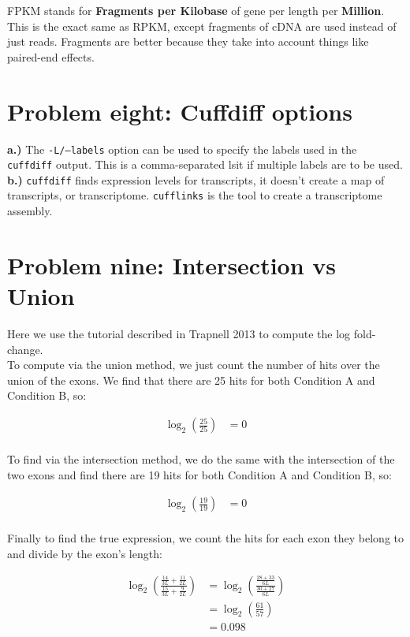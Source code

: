 \documentclass[10pt]{article} %
\begin{document}
FPKM stands for \textbf{Fragments per Kilobase} of gene per length per \textbf{Million}.
This is the exact same as RPKM, except fragments of cDNA are used instead of just reads.
Fragments are better because they take into account things like paired-end effects.\\

\section{Problem eight: Cuffdiff options}

\textbf{a.)} The \texttt{-L/--labels} option can be used to specify the labels used
in the \texttt{cuffdiff} output. This is a comma-separated lsit if multiple labels
are to be used.\\

\textbf{b.)} \texttt{cuffdiff} finds expression levels for transcripts, it doesn't create
a map of transcripts, or transcriptome. \texttt{cufflinks} is the tool to create a
transcriptome assembly.\\

\section{Problem nine: Intersection vs Union}
Here we use the tutorial described in Trapnell 2013 to compute the log fold-change.\\

To compute via the union method, we just count the number of hits over the union of
the exons. We find that there are 25 hits for both Condition A and Condition B, so:

\begin{align*}
  \log_2\left(\frac{25}{25}\right) &= 0\\
\end{align*}

To find via the intersection method, we do the same with the intersection of the two
exons and find there are 19 hits for both Condition A and Condition B, so:

\begin{align*}
  \log_2\left(\frac{19}{19}\right) &= 0\\
\end{align*}

Finally to find the true expression, we count the hits for each exon they belong to
and divide by the exon's length:

\begin{align*}
  \log_2\left(\frac{\frac{14}{3L}+\frac{11}{2L}}{\frac{15}{3L}+\frac{9}{2L}}\right)
  &= \log_2\left(\frac{\frac{28+33}{6L}}{\frac{30+27}{6L}}\right)\\
  &= \log_2\left(\frac{61}{57}\right)\\
  &= 0.098\\
\end{align*}
\end{document}
